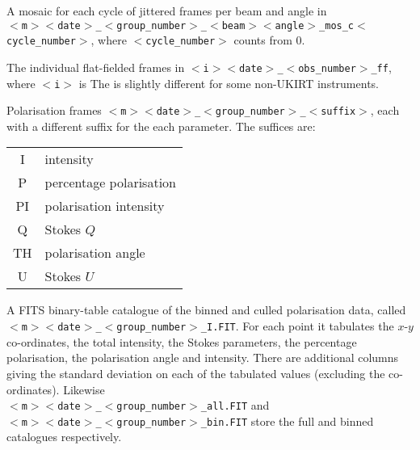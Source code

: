 \documentclass[twoside,11pt,nolof]{starlink}
\begin{document}
{{{         \sstitem
         A mosaic for each cycle of jittered frames per beam and angle in \\
         {\tt$<$m$>$$<$date$>$\_$<$group\_number$>$\_$<$beam$>$$<$angle$>$\_mos\_c$<$cycle\_number$>$}, where
         {\tt$<$cycle\_number$>$} counts from 0.

         \sstitem
         The individual flat-fielded frames in {\tt$<$i$>$$<$date$>$\_$<$obs\_number$>$\_ff},
         where {\tt$<$i$>$} is   The
          is slightly different for some non-UKIRT
         instruments.

         \sstitem
         Polarisation frames {\tt$<$m$>$$<$date$>$\_$<$group\_number$>$\_$<$suffix$>$}, each with a
         different suffix for the each parameter.  The suffices are:\\
         \begin{tabular}{cl}
             I &  intensity \\
             P &  percentage polarisation \\
             PI &  polarisation intensity \\
             Q  &  Stokes $Q$ \\
             TH & polarisation angle \\
             U  &  Stokes $U$ \\
         \end{tabular}

         \sstitem
         A FITS binary-table catalogue of the binned and culled
         polarisation data, called {\tt$<$m$>$$<$date$>$\_$<$group\_number$>$\_I.FIT}.  For
         each point it tabulates the $x$-$y$ co-ordinates, the total intensity,
         the Stokes parameters, the percentage polarisation, the polarisation
         angle and intensity.  There are additional columns giving the
         standard deviation on each of the tabulated values (excluding the
         co-ordinates).  Likewise \\
         {\tt$<$m$>$$<$date$>$\_$<$group\_number$>$\_all.FIT} and \\
         {\tt$<$m$>$$<$date$>$\_$<$group\_number$>$\_bin.FIT} store the full
         and binned catalogues respectively.
      }
   }
   \sstimplementationstatus{
      \sstitemlist{

}}}
\end{document}
